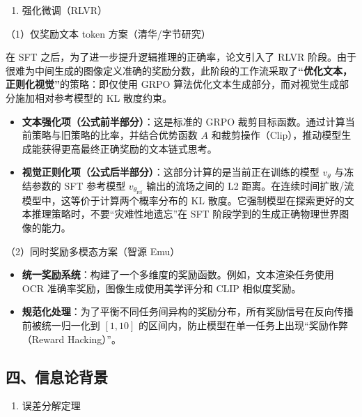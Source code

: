 \begin{enumerate}
\def\labelenumi{\arabic{enumi}.}
\setcounter{enumi}{1}
\tightlist
\item
  强化微调（RLVR）
\end{enumerate}

（1）仅奖励文本 token 方案（清华/字节研究）

在 SFT 之后，为了进一步提升逻辑推理的正确率，论文引入了 RLVR 阶段。由于很难为中间生成的图像定义准确的奖励分数，此阶段的工作流采取了\textbf{``优化文本，正则化视觉''}的策略：即仅使用 GRPO 算法优化文本生成部分，而对视觉生成部分施加相对参考模型的 KL 散度约束。

\begin{itemize}
\tightlist
\item
  \textbf{文本强化项（公式前半部分）}：这是标准的 GRPO 裁剪目标函数。通过计算当前策略与旧策略的比率，并结合优势函数 \(A\) 和裁剪操作（Clip），推动模型生成能获得更高最终正确奖励的文本链式思考。
\item
  \textbf{视觉正则化项（公式后半部分）}：这部分计算的是当前正在训练的模型 \(v_{\theta}\) 与冻结参数的 SFT 参考模型 \(v_{\theta_{\mathrm{ref}}}\) 输出的流场之间的 L2 距离。在连续时间扩散/流模型中，这等价于计算两个概率分布的 KL 散度。它强制模型在探索更好的文本推理策略时，不要``灾难性地遗忘''在 SFT 阶段学到的生成正确物理世界图像的能力。
\end{itemize}

（2）同时奖励多模态方案（智源 Emu）

\begin{itemize}
\tightlist
\item
  \textbf{统一奖励系统}：构建了一个多维度的奖励函数。例如，文本渲染任务使用 OCR 准确率奖励，图像生成使用美学评分和 CLIP 相似度奖励。
\item
  \textbf{规范化处理}：为了平衡不同任务间异构的奖励分布，所有奖励信号在反向传播前被统一归一化到 \([1,10]\) 的区间内，防止模型在单一任务上出现``奖励作弊（Reward Hacking）''。
\end{itemize}

\hypertarget{ux56dbux4fe1ux606fux8bbaux80ccux666f}{%
\subsection{四、信息论背景}\label{ux56dbux4fe1ux606fux8bbaux80ccux666f}}

\begin{enumerate}
\def\labelenumi{\arabic{enumi}.}
\tightlist
\item
  误差分解定理
\end{enumerate}

